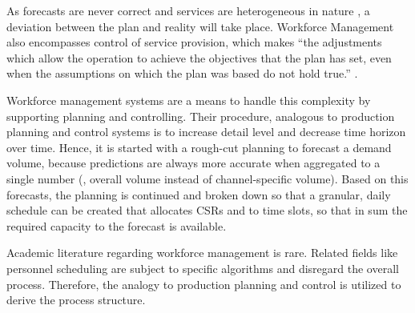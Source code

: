 		As forecasts are never correct and services are heterogeneous in nature \citep{cowell}, a deviation between the plan and reality will take place. Workforce Management also encompasses control of service provision, which makes \enquote{the adjustments which allow the operation to achieve the objectives that the plan has set, even when the assumptions on which the plan was based do not hold true.} \citep[]{9780273756194}. 
		
		Workforce management systems are a means to handle this complexity by supporting planning and controlling. Their procedure, analogous to production planning and control systems is to increase detail level and decrease time horizon over time. Hence, it is started with a rough-cut planning to forecast a demand volume, because predictions are always more accurate when aggregated to a single number (\eg, overall volume instead of channel-specific volume). Based on this forecasts, the planning is continued and broken down so that a granular, daily schedule can be created that allocates \acrshort{CSR}s and to time slots, so that in sum the required capacity \wrt to the forecast is available.  
		
		Academic literature regarding workforce management is rare. Related fields like personnel scheduling are subject to specific algorithms and disregard the overall process. Therefore, the analogy to production planning and control is utilized to derive the process structure. 
		
